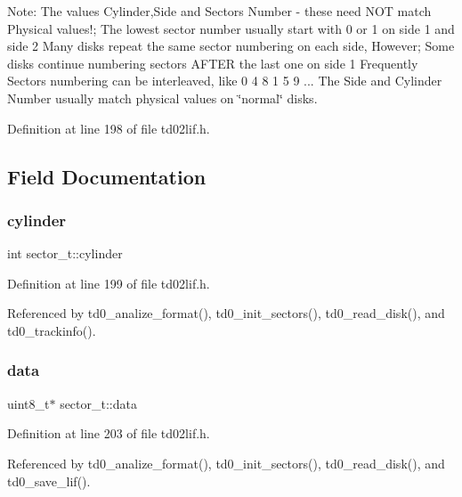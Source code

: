 Note\+: The values Cylinder,Side and Sectors Number -\/ these need N\+OT match Physical values!; The lowest sector number usually start with 0 or 1 on side 1 and side 2 Many disks repeat the same sector numbering on each side, However; Some disks continue numbering sectors A\+F\+T\+ER the last one on side 1 Frequently Sectors numbering can be interleaved, like 0 4 8 1 5 9 ... The Side and Cylinder Number usually match physical values on \char`\"{}normal\char`\"{} disks. 

Definition at line 198 of file td02lif.\+h.



\subsection{Field Documentation}
\mbox{\label{structsector__t_abf5eb245097466ac9624e59a379a2409}} 
\subsubsection{\texorpdfstring{cylinder}{cylinder}}
{\footnotesize\ttfamily int sector\+\_\+t\+::cylinder}



Definition at line 199 of file td02lif.\+h.



Referenced by td0\+\_\+analize\+\_\+format(), td0\+\_\+init\+\_\+sectors(), td0\+\_\+read\+\_\+disk(), and td0\+\_\+trackinfo().

\mbox{\label{structsector__t_a3a7122a3121eb84094a889be7e6ed042}} 
\subsubsection{\texorpdfstring{data}{data}}
{\footnotesize\ttfamily uint8\+\_\+t$\ast$ sector\+\_\+t\+::data}



Definition at line 203 of file td02lif.\+h.



Referenced by td0\+\_\+analize\+\_\+format(), td0\+\_\+init\+\_\+sectors(), td0\+\_\+read\+\_\+disk(), and td0\+\_\+save\+\_\+lif().

